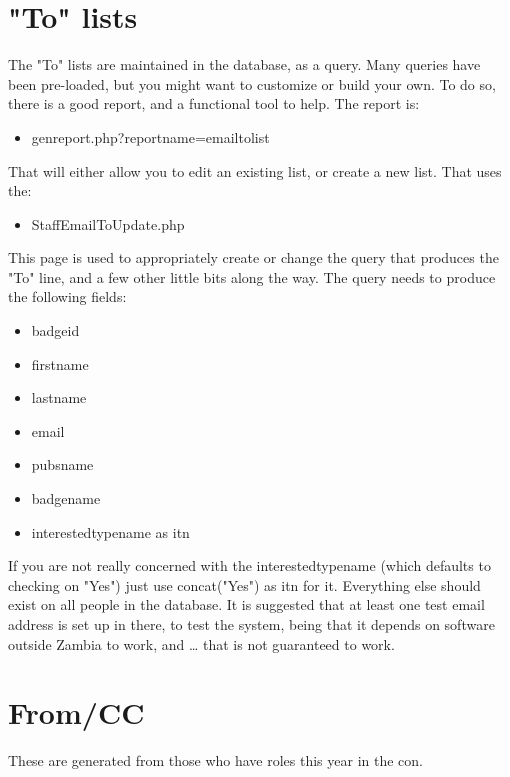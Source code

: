 \documentclass[captions=tablesignature]{scrartcl}
\begin{document}
\section{"To" lists}
\label{sec-3}
The "To" lists are maintained in the database, as a query.  Many
queries have been pre-loaded, but you might want to customize or
build your own.  To do so, there is a good report, and a functional
tool to help.  The report is:
\begin{itemize}
\item genreport.php?reportname=emailtolist
\end{itemize}
That will either allow you to edit an existing list, or create a new
list.  That uses the:
\begin{itemize}
\item StaffEmailToUpdate.php
\end{itemize}
This page is used to appropriately create or change the query that
produces the "To" line, and a few other little bits along the way.
The query needs to produce the following fields:
\begin{itemize}
\item badgeid
\item firstname
\item lastname
\item email
\item pubsname
\item badgename
\item interestedtypename as itn
\end{itemize}
If you are not really concerned with the interestedtypename (which
defaults to checking on "Yes") just use concat("Yes") as itn for
it.  Everything else should exist on all people in the database.
It is suggested that at least one test email address is set up in
there, to test the system, being that it depends on software outside
Zambia to work, and \ldots{} that is not guaranteed to work.

\section{From/CC}
\label{sec-4}
These are generated from those who have roles this year in the con.
\end{document}
